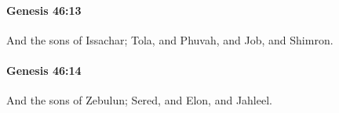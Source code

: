 		\paragraph{Genesis 46:13} %
			\label{GENESIS-46-13}

			And the sons of Issachar; Tola, and Phuvah, and Job, and Shimron.


		\paragraph{Genesis 46:14} %
			\label{GENESIS-46-14}

			And the sons of Zebulun; Sered, and Elon, and Jahleel.


